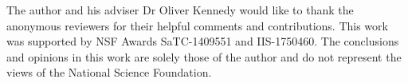 The author and his adviser Dr Oliver Kennedy would like to thank the anonymous reviewers for their helpful comments and contributions. This work was supported by NSF Awards SaTC-1409551 and IIS-1750460. The conclusions and opinions in this work are solely those of the author and do not represent the views of the National Science Foundation.